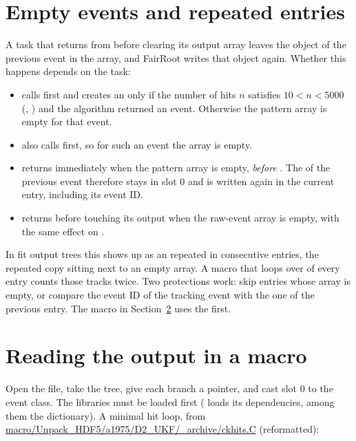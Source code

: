 \section{Empty events and repeated entries}
\label{sec:dm-repeat}

A task that returns from  before clearing its output array leaves the object of the previous
event in the array, and FairRoot writes that object again. Whether this happens depends on the task:

\begin{itemize}
\item {} calls  first and creates an
   only if the number of hits $n$ satisfies $10 < n < 5000$ (,
  ) and the algorithm returned an event. Otherwise the pattern array is empty for that
  event.
\item {} also calls  first, so for such an event the 
  array is empty.
\item {} returns immediately when the pattern array is empty, \emph{before}
  . The  of the previous event therefore stays
  in slot 0 and is written again in the current entry, including its event ID.
\item {} returns before touching its output when the raw-event array is empty, with
  the same effect on .
\end{itemize}

In fit output trees this shows up as an  repeated in consecutive entries, the
repeated copy sitting next to an empty  array. A macro that loops over
 of every entry counts those tracks twice. Two protections work: skip entries
whose  array is empty, or compare the event ID of the tracking event with the one of the
previous entry. The macro in Section~\ref{sec:dm-reading} uses the first.

\section{Reading the output in a macro}
\label{sec:dm-reading}

Open the file, take the  tree, give each branch a  pointer, and cast slot
0 to the event class. The libraries must be loaded first (
loads its dependencies, among them the  dictionary). A minimal hit loop, from
\url{macro/Unpack_HDF5/a1975/D2_UKF/_archive/ckhits.C} (reformatted):

